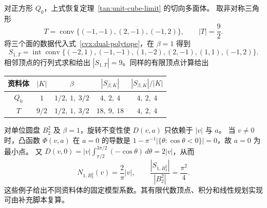 \begin{example}\label{cvx:explicit-shapes}
对正方形 $Q_0$，上式恢复定理~\ref{tan:unit-cube-limit} 的切向多面体。
取非对称三角形
\[
 T=\operatorname{conv}\{(-1,-1),(2,-1),(-1,2)\},\qquad |T|=\frac92.
\]
将三个面的数据代入式~\eqref{cvx:dual-polytope}，在 $\beta=1$ 得到
\[
 S_{1,T}=\operatorname{int}\operatorname{conv}
 \{(-2,1),(-1,-1),(1,-2),(2,-1),(1,1),(-1,2)\}.
\]
相邻顶点的行列式求和给出 $|S_{1,T}|=9$。同样的有限顶点计算给出
\begin{center}
\begin{tabular}{ccccc}
\toprule
资料体 & $|K|$ & $\beta$ & $|S_{\beta,K}|$ & $|S_{\beta,K}|/|K|$\\
\midrule
$Q_0$ & $1$ & $1/2,\ 1,\ 3/2$ & $4,\ 2,\ 4$ & $4,\ 2,\ 4$\\
$T$ & $9/2$ & $1/2,\ 1,\ 3/2$ & $18,\ 9,\ 18$ & $4,\ 2,\ 4$\\
\bottomrule
\end{tabular}
\end{center}

对单位圆盘 $B_2^2$ 及 $\beta=1$，旋转不变性使 $D(v,a)$ 只依赖于 $|v|$ 与 $a$。
当 $v\ne0$ 时，凸函数 $\Phi(v,a)$ 在 $a=0$ 的导数是
$1-\pi^{-1}|\{\theta:\cos\theta<0\}|=0$，故 $a=0$ 为最小点。
又 $D(v,0)=|v|\int_{\pi/2}^{3\pi/2}(-\cos\theta)\,d\theta=2|v|$，从而
\[
 N_{1,B_2^2}(v)=\frac2\pi|v|,\qquad
 \frac{|S_{1,B_2^2}|}{|B_2^2|}=\frac{\pi^2}{4}.
\]
这些例子给出不同资料体的固定模型系数。其有限代数顶点、积分和线性规划实现
可由补充脚本复算。
\end{example}
